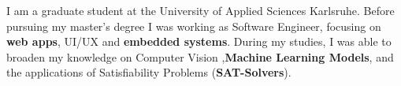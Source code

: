\documentclass[8pt]{developercv} %
\begin{document}
\vspace{0.5cm}



\begin{minipage}[t]{0.4\textwidth} %
	\vspace{-\baselineskip} %
	
	I am a graduate student at the University of Applied Sciences Karlsruhe. Before pursuing my master's degree I was working as Software Engineer, focusing on \textbf{web apps}, UI/UX and \textbf{embedded systems}.
    During my studies, I was able to broaden my knowledge on Computer Vision ,\textbf{Machine Learning Models}, and the applications of Satisfiability Problems (\textbf{SAT-Solvers}).
\end{minipage}
\hfill %
\begin{minipage}[t]{0.5\textwidth} %
	\vspace{-\baselineskip} %
	\begin{barchart}{5.5}
	\end{barchart}
\end{minipage}



\end{document}
